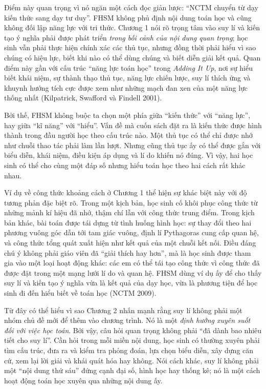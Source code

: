 Điểm này quan trọng vì nó ngăn một cách đọc giản lược: ``NCTM chuyển từ dạy kiến thức sang dạy tư duy''. FHSM không phủ định nội dung toán học và cũng không đối lập năng lực với tri thức. Chương 1 nói rõ trọng tâm vào suy lí và kiến tạo ý nghĩa phải được phát triển \emph{trong bối cảnh của nội dung quan trọng}; học sinh vẫn phải thực hiện chính xác các thủ tục, nhưng đồng thời phải hiểu vì sao chúng có hiệu lực, biết khi nào có thể dùng chúng và biết diễn giải kết quả. Quan điểm này gần với cấu trúc ``năng lực toán học'' trong \emph{Adding It Up}, nơi sự hiểu biết khái niệm, sự thành thạo thủ tục, năng lực chiến lược, suy lí thích ứng và khuynh hướng tích cực được xem như những mạch đan xen của một năng lực thống nhất (Kilpatrick, Swafford và Findell 2001).

Bởi thế, FHSM không buộc ta chọn một phía giữa ``kiến thức'' với ``năng lực'', hay giữa ``kĩ năng'' với ``hiểu''. Vấn đề mà cuốn sách đặt ra là kiến thức được hình thành trong đầu người học theo cấu trúc nào. Một thủ tục có thể chỉ được nhớ như chuỗi thao tác phải làm lần lượt. Nhưng cũng thủ tục ấy có thể được gắn với biểu diễn, khái niệm, điều kiện áp dụng và lí do khiến nó đúng. Vì vậy, hai học sinh có thể cho cùng một đáp số nhưng hiểu toán học theo hai cách rất khác nhau.

Ví dụ về công thức khoảng cách ở Chương 1 thể hiện sự khác biệt này với độ tương phản đặc biệt rõ. Trong một kịch bản, học sinh cố khôi phục công thức từ những mảnh kí hiệu đã nhớ, thậm chí lẫn với công thức trung điểm. Trong kịch bản khác, bài toán được tái dựng từ tình huống hình học: sự thay đổi theo hai phương vuông góc dẫn tới tam giác vuông, định lí Pythagoras cung cấp quan hệ, và công thức tổng quát xuất hiện như kết quả của một chuỗi kết nối. Điều đáng chú ý không phải giáo viên đã ``giải thích hay hơn'', mà là học sinh được tham gia vào một loại hoạt động khác: các em có thể tái tạo công thức vì công thức đã được đặt trong một mạng lưới lí do và quan hệ. FHSM dùng ví dụ ấy để cho thấy suy lí và kiến tạo ý nghĩa vừa là kết quả của dạy học, vừa là phương tiện để học sinh đi đến hiểu biết về toán học (NCTM 2009).

Từ đây có thể hiểu vì sao Chương 2 nhấn mạnh rằng suy lí không phải một nhóm chủ đề mới để thêm vào chương trình. Nó là một \emph{định hướng xuyên suốt đối với việc học toán}. Bởi vậy, câu hỏi quan trọng không phải ``đã dành bao nhiêu tiết cho suy lí''. Cần hỏi trong mỗi miền nội dung, học sinh có thường xuyên phải tìm cấu trúc, đưa ra và kiểm tra phỏng đoán, lựa chọn biểu diễn, xây dựng căn cứ, xem lại lời giải và khái quát hóa hay không. Nói cách khác, suy lí không phải một ``nội dung thứ sáu'' đứng cạnh đại số, hình học hay thống kê; nó là một cách hoạt động toán học xuyên qua những nội dung ấy.

